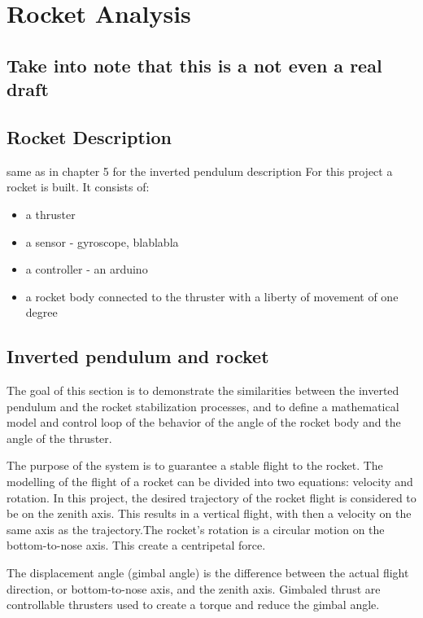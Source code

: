 							\chapter{Rocket Analysis}

		\section{Take into note that this is a not even a real draft}
		
		
		
		
	\section{ Rocket Description}

same as in chapter 5 for the inverted pendulum description
For this project a rocket is built. It consists of:
\begin{itemize}
\item a thruster
\item a sensor - gyroscope, blablabla
\item a controller - an arduino
\item a rocket body connected to the thruster with a liberty of movement of one degree
\end{itemize}

	\section{Inverted pendulum and rocket}
The goal of this section is to demonstrate the similarities between the inverted pendulum and the rocket stabilization processes, and to define a mathematical model and control loop of the behavior of the angle of the rocket body and the angle of the thruster.

The purpose of the system is to guarantee a stable flight to the rocket.
The modelling of the flight of a rocket can be divided into two equations: velocity and rotation. In this project, the desired trajectory of the rocket flight is considered to be on the zenith axis. This results in a vertical flight, with then a velocity on the same axis as the trajectory.The rocket's rotation is a circular motion on the bottom-to-nose axis. This create a centripetal force.

The displacement angle (gimbal angle) is the difference between the actual flight direction, or bottom-to-nose axis, and the zenith axis. Gimbaled thrust are controllable thrusters used to create a torque and reduce the gimbal angle. 

